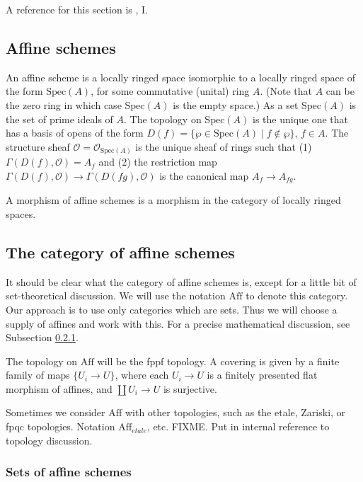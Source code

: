 \smallskip\noindent
A reference for this section is \cite{EGA}, I.

\subsection{Affine schemes}
\label{subsection-affine-schemes}

\noindent
An affine scheme is a locally ringed space isomorphic to a locally ringed
space of the form $\text{Spec}(A)$, for some commutative (unital) ring $A$.
(Note that $A$ can be the zero ring in which case $\text{Spec}(A)$ is
the empty space.) As a set $\text{Spec}(A)$ is the set of prime ideals of
$A$. The topology on $\text{Spec}(A)$ is the unique one that has a basis
of opens of the form $D(f) = \{ \wp \in\text{Spec}(A) \mid
f \not\in \wp \}$,
$f\in A$. The structure sheaf $\mathcal{O} = 
\mathcal{O}_{\text{Spec}(A)}$ is the unique
sheaf of rings such that (1) $\Gamma(D(f), \mathcal{O}) = A_f$ and
(2) the restriction map $\Gamma(D(f), \mathcal{O}) \to \Gamma(D(fg),
\mathcal{O})$ is the canonical map $A_f \to A_{fg}$.

\smallskip\noindent
A morphism of affine schemes is a morphism in the category of locally ringed 
spaces.

\subsection{The category of affine schemes}
\label{subsection-affine-schemes}

\noindent
It should be clear what the category of affine schemes is, except for a
little bit of set-theoretical discussion. We will use the notation
$\text{Aff}$ to denote this category. Our approach is to use only
categories which are sets. Thus we will choose a supply of affines and
work with this. For a precise mathematical discussion, see
Subsection \ref{subsection-sets-of-affines}.

\smallskip\noindent
The topology on $\text{Aff}$ will be the fppf topology. A covering is
given by a finite family of maps $\{U_i \to U\}$, where each $U_i \to U$
is a finitely presented flat morphism of affines, and $\coprod U_i \to U$
is surjective. 

\smallskip\noindent
Sometimes we consider $\text{Aff}$ with other topologies, such as the
etale, Zariski, or fpqc topologies. Notation $\text{Aff}_{etale}$, etc.
FIXME. Put in internal reference to topology discussion.

\subsubsection{Sets of affine schemes}
\label{subsection-sets-of-affines}

